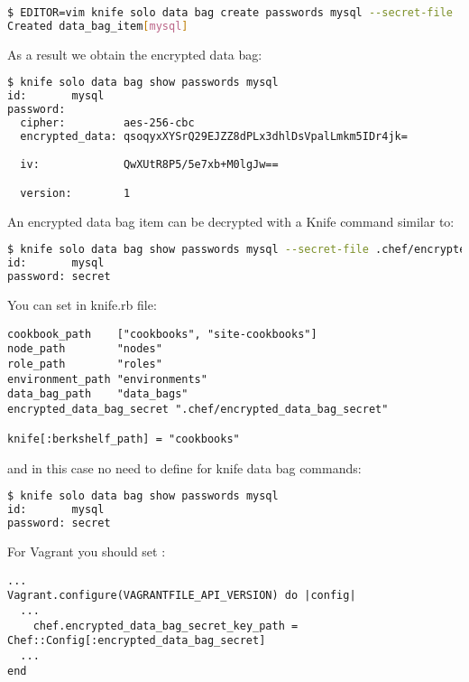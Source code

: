\begin{lstlisting}[language=Bash,label=lst:my-cloud-chef-databag6]
$ EDITOR=vim knife solo data bag create passwords mysql --secret-file .chef/encrypted_data_bag_secret
Created data_bag_item[mysql]
\end{lstlisting}

As a result we obtain the encrypted data bag:

\begin{lstlisting}[language=Bash,label=lst:my-cloud-chef-databag7]
$ knife solo data bag show passwords mysql
id:       mysql
password:
  cipher:         aes-256-cbc
  encrypted_data: qsoqyxXYSrQ29EJZZ8dPLx3dhlDsVpalLmkm5IDr4jk=

  iv:             QwXUtR8P5/5e7xb+M0lgJw==

  version:        1
\end{lstlisting}

An encrypted data bag item can be decrypted with a Knife command similar to:

\begin{lstlisting}[language=Bash,label=lst:my-cloud-chef-databag8,title=my-cloud/Gemfile]
$ knife solo data bag show passwords mysql --secret-file .chef/encrypted_data_bag_secret
id:       mysql
password: secret
\end{lstlisting}

You can set  in knife.rb file:

\begin{lstlisting}[label=lst:my-cloud-chef-databag9,title=my-cloud/.chef/knife.rb]
cookbook_path    ["cookbooks", "site-cookbooks"]
node_path        "nodes"
role_path        "roles"
environment_path "environments"
data_bag_path    "data_bags"
encrypted_data_bag_secret ".chef/encrypted_data_bag_secret"

knife[:berkshelf_path] = "cookbooks"
\end{lstlisting}

and in this case no need to define  for knife data bag commands:

\begin{lstlisting}[language=Bash,label=lst:my-cloud-chef-databag11]
$ knife solo data bag show passwords mysql
id:       mysql
password: secret
\end{lstlisting}

For Vagrant you should set :

\begin{lstlisting}[label=lst:my-cloud-chef-databag12,title=my-cloud/Vagrantfile]
...
Vagrant.configure(VAGRANTFILE_API_VERSION) do |config|
  ...
    chef.encrypted_data_bag_secret_key_path = Chef::Config[:encrypted_data_bag_secret]
  ...
end
\end{lstlisting}

